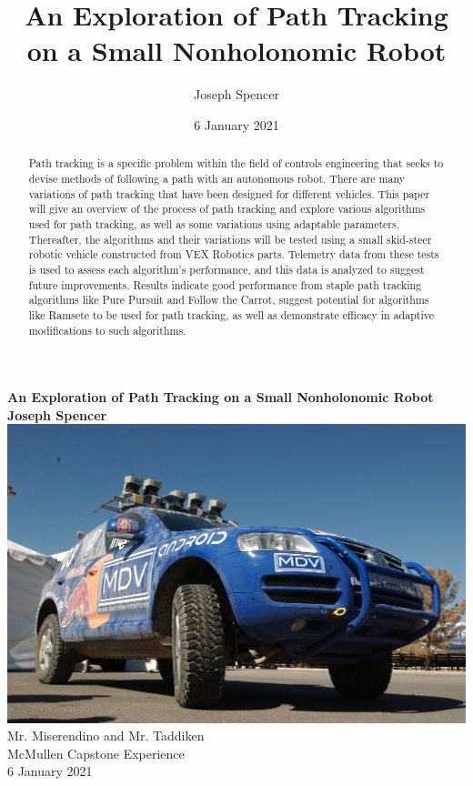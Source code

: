 \documentclass[mla8alt]{mla}
\title{An Exploration of Path Tracking on a Small Nonholonomic Robot}
\author{Joseph Spencer}
\date{6 January 2021}
\begin{document}
\begin{titlepage}
\begin{center}
\textbf{An Exploration of Path Tracking on a Small Nonholonomic Robot} \\
\vspace*{0.5cm}
\textbf{Joseph Spencer}\\
\vspace*{1cm}
\noindent
\includegraphics[width=\linewidth]{Stanley}
Mr. Miserendino and Mr. Taddiken \\ McMullen Capstone Experience \\ 6 January 2021
\end{center}
\end{titlepage}

\newpage

\tableofcontents

\newpage

\begin{abstract}

Path tracking is a specific problem within the field of controls engineering that seeks to devise methods of following a path with an autonomous robot. There are many variations of path tracking that have been designed for different vehicles. This paper will give an overview of the process of path tracking and explore various algorithms used for path tracking, as well as some variations using adaptable parameters. Thereafter, the algorithms and their variations will be tested using a small skid-steer robotic vehicle constructed from VEX Robotics parts. Telemetry data from these tests is used to assess each algorithm's performance, and this data is analyzed to suggest future improvements. Results indicate good performance from staple path tracking algorithms like Pure Pursuit and Follow the Carrot, suggest potential for algorithms like Ramsete to be used for path tracking, as well as demonstrate efficacy in adaptive modifications to such algorithms.

\end{abstract}
\end{document}
